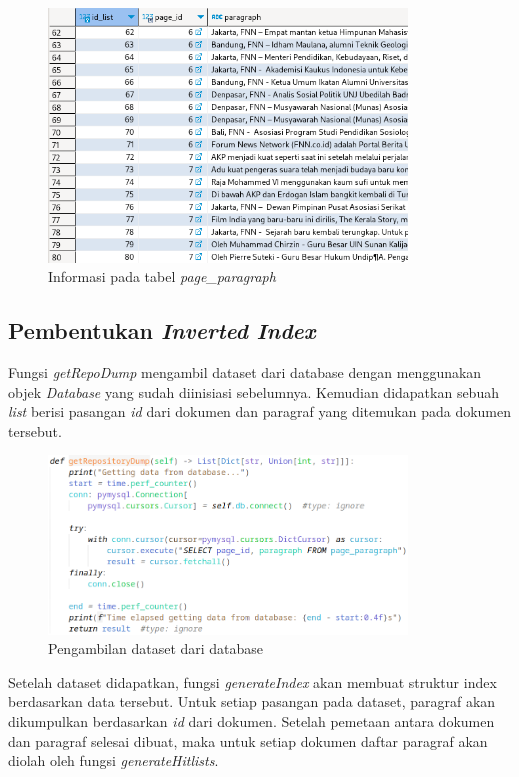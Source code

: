 \begin{figure}[H]
  \centering{}
	\includegraphics[width=0.85\textwidth]{gambar/implementasi_pageparagraph}
  \caption{Informasi pada tabel \textit{page\_paragraph}}
\end{figure}

\subsection{Pembentukan \textit{Inverted Index}}

Fungsi \textit{getRepoDump} mengambil dataset dari database dengan menggunakan 
objek \textit{Database} yang sudah diinisiasi sebelumnya. Kemudian didapatkan
sebuah \textit{list} berisi pasangan \textit{id} dari dokumen dan paragraf yang
ditemukan pada dokumen tersebut.

\begin{figure}[H]
  \centering{}
	\includegraphics[width=0.85\textwidth]{gambar/implementasi_getrepodump}
  \caption{Pengambilan dataset dari database}
\end{figure}

Setelah dataset didapatkan, fungsi \textit{generateIndex} akan membuat struktur 
index berdasarkan data tersebut. Untuk setiap pasangan pada dataset, paragraf 
akan dikumpulkan berdasarkan \textit{id} dari dokumen. Setelah pemetaan antara 
dokumen dan paragraf selesai dibuat, maka untuk setiap dokumen daftar paragraf 
akan diolah oleh fungsi \textit{generateHitlists}.

